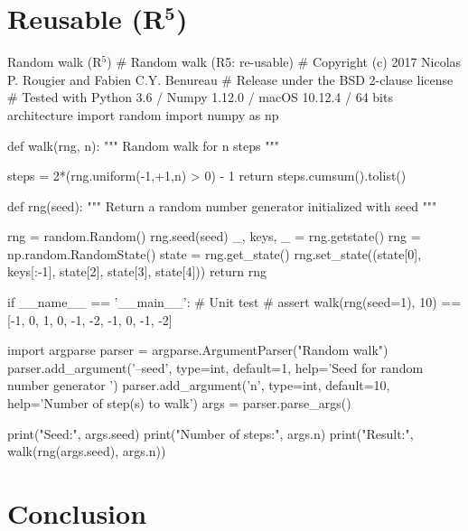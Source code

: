 \documentclass[a4paper,11pt]{article}
\begin{document}
\clearpage
\section*{Reusable (R$^{\mathbf 5}$)}

\begin{code}{Random walk (R$^5$)}
# Random walk (R5: re-usable)
# Copyright (c) 2017 Nicolas P. Rougier and Fabien C.Y. Benureau
# Release under the BSD 2-clause license
# Tested with Python 3.6 / Numpy 1.12.0 / macOS 10.12.4 / 64 bits architecture
import random
import numpy as np

def walk(rng, n):
    """ Random walk for n steps """

    steps = 2*(rng.uniform(-1,+1,n) > 0) - 1
    return steps.cumsum().tolist()

def rng(seed):
    """ Return a random number generator initialized with seed """ 
    
    rng = random.Random()
    rng.seed(seed)
    _, keys, _ = rng.getstate()
    rng = np.random.RandomState()
    state = rng.get_state()
    rng.set_state((state[0], keys[:-1], state[2], state[3], state[4]))
    return rng
    
if __name__ == '__main__':
    # Unit test
    # assert walk(rng(seed=1), 10) == [-1, 0, 1, 0, -1, -2, -1, 0, -1, -2]
    
    import argparse
    parser = argparse.ArgumentParser("Random walk")
    parser.add_argument('--seed', type=int, default=1,
                        help='Seed for random number generator ')
    parser.add_argument('n', type=int, default=10,
                        help='Number of step(s) to walk')
    args = parser.parse_args()

    print("Seed:", args.seed)
    print("Number of steps:", args.n)
    print("Result:",  walk(rng(args.seed), args.n))
\end{code}




\clearpage
\section*{Conclusion}


\renewcommand*{\bibfont}{\small}
\printbibliography[title=References]
\end{document}
